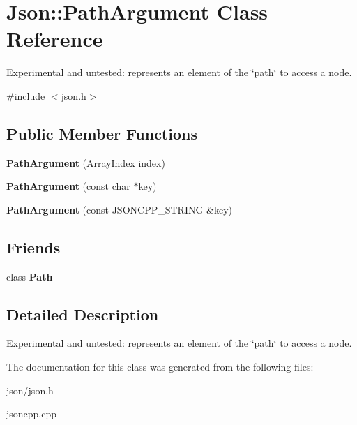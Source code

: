 \hypertarget{classJson_1_1PathArgument}{}\section{Json\+:\+:Path\+Argument Class Reference}
\label{classJson_1_1PathArgument}


Experimental and untested\+: represents an element of the \char`\"{}path\char`\"{} to access a node.  




{\ttfamily \#include $<$json.\+h$>$}

\subsection*{Public Member Functions}
\begin{DoxyCompactItemize}
\item 
\mbox{\label{classJson_1_1PathArgument_a53c5b27143b161301b95fd544c139ecf}} 
{\bfseries Path\+Argument} (Array\+Index index)
\item 
\mbox{\label{classJson_1_1PathArgument_a9690417a8a40e6e49f2acdf6c9281345}} 
{\bfseries Path\+Argument} (const char $\ast$key)
\item 
\mbox{\label{classJson_1_1PathArgument_ac15f25452124fbf21218897113015301}} 
{\bfseries Path\+Argument} (const J\+S\+O\+N\+C\+P\+P\+\_\+\+S\+T\+R\+I\+NG \&key)
\end{DoxyCompactItemize}
\subsection*{Friends}
\begin{DoxyCompactItemize}
\item 
\mbox{\label{classJson_1_1PathArgument_a4877239a6b7f09fbf5a61ca68a49d74c}} 
class {\bfseries Path}
\end{DoxyCompactItemize}


\subsection{Detailed Description}
Experimental and untested\+: represents an element of the \char`\"{}path\char`\"{} to access a node. 

The documentation for this class was generated from the following files\+:\begin{DoxyCompactItemize}
\item 
json/json.\+h\item 
jsoncpp.\+cpp\end{DoxyCompactItemize}
